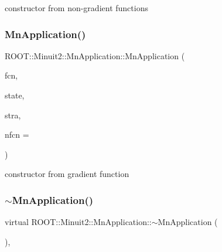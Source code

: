 constructor from non-\/gradient functions 

\mbox{\label{classROOT_1_1Minuit2_1_1MnApplication_a07b6eb3c240c0d2360d466ab1f1a85ec}} 
\subsubsection{\texorpdfstring{MnApplication()}{MnApplication()}\hspace{0.1cm}{\footnotesize\ttfamily [4/6]}}
{\footnotesize\ttfamily R\+O\+O\+T\+::\+Minuit2\+::\+Mn\+Application\+::\+Mn\+Application (\begin{DoxyParamCaption}\item[{const \mbox{\hyperlink{classROOT_1_1Minuit2_1_1FCNGradientBase}{F\+C\+N\+Gradient\+Base}} \&}]{fcn,  }\item[{const \mbox{\hyperlink{classROOT_1_1Minuit2_1_1MnUserParameterState}{Mn\+User\+Parameter\+State}} \&}]{state,  }\item[{const \mbox{\hyperlink{classROOT_1_1Minuit2_1_1MnStrategy}{Mn\+Strategy}} \&}]{stra,  }\item[{unsigned int}]{nfcn = {} }\end{DoxyParamCaption})}



constructor from gradient function 

\mbox{\label{classROOT_1_1Minuit2_1_1MnApplication_ab8f38ab869bbfe082a2dbcefe1fb19de}} 
\subsubsection{\texorpdfstring{$\sim$MnApplication()}{~MnApplication()}\hspace{0.1cm}{\footnotesize\ttfamily [2/3]}}
{\footnotesize\ttfamily virtual R\+O\+O\+T\+::\+Minuit2\+::\+Mn\+Application\+::$\sim$\+Mn\+Application (\begin{DoxyParamCaption}{ }\end{DoxyParamCaption})\hspace{0.3cm}{\ttfamily [inline]}, {\ttfamily [virtual]}}

